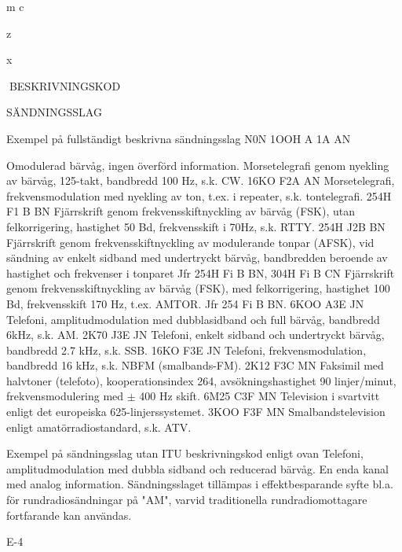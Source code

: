 m
c

z

x

BESKRIVNINGSKOD

SÄNDNINGSSLAG

Exempel på fullständigt beskrivna sändningsslag
N0N
1OOH A 1A AN

Omodulerad bärvåg, ingen överförd information.
Morsetelegrafi genom nyekling av bärvåg, 125-takt, bandbredd 100 Hz, s.k. CW.
16KO F2A AN Morsetelegrafi, frekvensmodulation med nyekling av ton,
t.ex. i repeater, s.k. tontelegrafi.
254H F1 B BN Fjärrskrift genom frekvensskiftnyckling av bärvåg (FSK),
utan felkorrigering, hastighet 50 Bd, frekvensskift i 70Hz,
s.k. RTTY.
254H J2B BN Fjärrskrift genom frekvensskiftnyckling av modulerande
tonpar (AFSK), vid sändning av enkelt sidband med undertryckt bärvåg, bandbredden beroende av hastighet och
frekvenser i tonparet
Jfr 254H Fi B BN,
304H Fi B CN Fjärrskrift genom frekvensskiftnyckling av bärvåg (FSK),
med felkorrigering, hastighet 100 Bd, frekvensskift 170
Hz, t.ex. AMTOR. Jfr 254 Fi B BN.
6KOO A3E JN Telefoni, amplitudmodulation med dubblasidband och full
bärvåg, bandbredd 6kHz, s.k. AM.
2K70 J3E JN Telefoni, enkelt sidband och undertryckt bärvåg, bandbredd 2.7 kHz, s.k. SSB.
16KO F3E JN
Telefoni, frekvensmodulation, bandbredd 16 kHz, s.k.
NBFM (smalbands-FM).
2K12 F3C MN Faksimil med halvtoner (telefoto), kooperationsindex 264,
avsökningshastighet 90 linjer/minut, frekvensmodulering
med \(\pm\) 400 Hz skift.
6M25 C3F MN Television i svartvitt enligt det europeiska 625-linjerssystemet.
3KOO F3F MN Smalbandstelevision enligt amatörradiostandard, s.k. ATV.

Exempel på sändningsslag utan ITU beskrivningskod enligt ovan
Telefoni, amplitudmodulation med dubbla sidband och
reducerad bärvåg.
En enda kanal med analog information.
Sändningsslaget tillämpas i effektbesparande syfte bl.a.
för rundradiosändningar på "AM", varvid traditionella
rundradiomottagare fortfarande kan användas.

E-4
